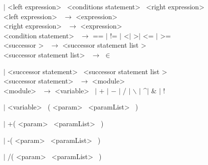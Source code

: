\hspace{2cm} $|$ \textless left expression\textgreater~ \textless conditions statement\textgreater~ \textless right expression\textgreater~ \\


\noindent
\textless left expression\textgreater~ $\rightarrow$ \textless expression\textgreater~ \\


\noindent
\textless right expression\textgreater~ $\rightarrow$ \textless expression\textgreater~ \\


\noindent
\textless condition statement\textgreater~ $\rightarrow$ == $|$ != $|$ \textless $|$ \textgreater $|$ \textless = $|$ \textgreater =\\



\noindent
\textless successor \textgreater~ $\rightarrow$ \textless successor statement list \textgreater~ \\


\noindent
\textless successor statement list\textgreater~ $\rightarrow$ $\in$

\hspace{2cm} $|$ \textless successor statement\textgreater~ \textless successor statement list \textgreater~ \\


\noindent
\textless successor statement\textgreater~ $\rightarrow$ \textless module\textgreater~ \\



\noindent
\textless module\textgreater~ $\rightarrow$  \textless variable\textgreater~ $|$ $+$ $|$ $-$ $|$ / $|$ $\backslash$ $|$ \textasciicircum $|$ $\&$ $|$ ! 

\hspace{2cm} $|$ \textless variable\textgreater~ (  \textless param\textgreater~ \textless paramList\textgreater~ )

\hspace{2cm} $|$ +(  \textless param\textgreater~ \textless paramList\textgreater~ )

\hspace{2cm} $|$ -(  \textless param\textgreater~ \textless paramList\textgreater~ )

\hspace{2cm} $|$ /(  \textless param\textgreater~ \textless paramList\textgreater~ ) 

